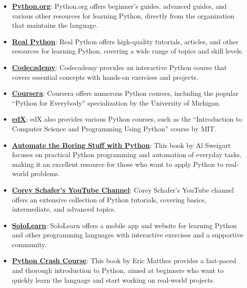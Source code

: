 \documentclass[
  paper=a4,
  ,captions=tableheading
]{scrartcl}
\begin{document}
\begin{itemize}
\item
  \textbf{\href{https://www.python.org/about/gettingstarted/}{Python.org}}:
  Python.org offers beginner's guides, advanced guides, and various
  other resources for learning Python, directly from the organization
  that maintains the language.
\item
  \textbf{\href{https://realpython.com/}{Real Python}}: Real Python
  offers high-quality tutorials, articles, and other resources for
  learning Python, covering a wide range of topics and skill levels.
\item
  \textbf{\href{https://www.codecademy.com/learn/learn-python-3}{Codecademy}}:
  Codecademy provides an interactive Python course that covers essential
  concepts with hands-on exercises and projects.
\item
  \textbf{\href{https://www.coursera.org/specializations/python}{Coursera}}:
  Coursera offers numerous Python courses, including the popular
  ``Python for Everybody'' specialization by the University of Michigan.
\item
  \textbf{\href{https://www.edx.org/course/introduction-to-computer-science-and-programming-7}{edX}}:
  edX also provides various Python courses, such as the ``Introduction
  to Computer Science and Programming Using Python'' course by MIT.
\item
  \textbf{\href{https://automatetheboringstuff.com/}{Automate the Boring
  Stuff with Python}}: This book by Al Sweigart focuses on practical
  Python programming and automation of everyday tasks, making it an
  excellent resource for those who want to apply Python to real-world
  problems.
\item
  \textbf{\href{https://www.youtube.com/user/schafer5}{Corey Schafer's
  YouTube Channel}}: Corey Schafer's YouTube channel offers an extensive
  collection of Python tutorials, covering basics, intermediate, and
  advanced topics.
\item
  \textbf{\href{https://www.sololearn.com/Course/Python/}{SoloLearn}}:
  SoloLearn offers a mobile app and website for learning Python and
  other programming languages with interactive exercises and a
  supportive community.
\item
  \textbf{\href{https://nostarch.com/pythoncrashcourse2e}{Python Crash
  Course}}: This book by Eric Matthes provides a fast-paced and thorough
  introduction to Python, aimed at beginners who want to quickly learn
  the language and start working on real-world projects.
\end{itemize}
\end{document}
